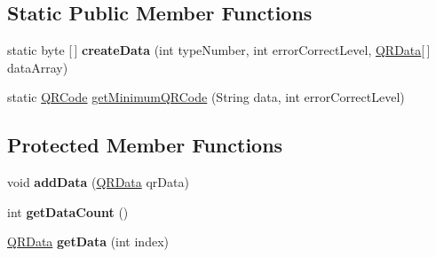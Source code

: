 \subsection*{Static Public Member Functions}
\begin{DoxyCompactItemize}
\item 
\mbox{\label{classcom_1_1d__project_1_1qrcode_1_1_q_r_code_a076cc8dee5deb77a09d1ea6ec527fc30}} 
static byte \mbox{[}$\,$\mbox{]} {\bfseries create\+Data} (int type\+Number, int error\+Correct\+Level, \hyperlink{class_q_r_data}{Q\+R\+Data}\mbox{[}$\,$\mbox{]} data\+Array)
\item 
static \hyperlink{classcom_1_1d__project_1_1qrcode_1_1_q_r_code}{Q\+R\+Code} \hyperlink{classcom_1_1d__project_1_1qrcode_1_1_q_r_code_a3130b29d5ceadb1fa74064c0e34bfc6a}{get\+Minimum\+Q\+R\+Code} (String data, int error\+Correct\+Level)
\end{DoxyCompactItemize}
\subsection*{Protected Member Functions}
\begin{DoxyCompactItemize}
\item 
\mbox{\label{classcom_1_1d__project_1_1qrcode_1_1_q_r_code_ad68ee39041521c1c0cb74538773067d2}} 
void {\bfseries add\+Data} (\hyperlink{class_q_r_data}{Q\+R\+Data} qr\+Data)
\item 
\mbox{\label{classcom_1_1d__project_1_1qrcode_1_1_q_r_code_aea41346573520fbccbbff27d6aec9535}} 
int {\bfseries get\+Data\+Count} ()
\item 
\mbox{\label{classcom_1_1d__project_1_1qrcode_1_1_q_r_code_a8ab36d337ab1140c2e0abb8d493c30e9}} 
\hyperlink{class_q_r_data}{Q\+R\+Data} {\bfseries get\+Data} (int index)
\end{DoxyCompactItemize}


